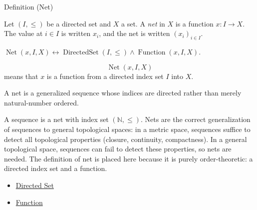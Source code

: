 \begin{definitionbox}{Definition (Net)}
\begin{definition}[Net]\label{def:net}
Let $(I, \leq)$ be a directed set and $X$ a set. A \emph{net} in $X$ is a
function $x : I \to X$. The value at $i \in I$ is written $x_i$, and the
net is written $(x_i)_{i \in I}$.
\end{definition}
\end{definitionbox}

\begin{remark*}
$\operatorname{Net}(x,I,X)\leftrightarrow
\operatorname{DirectedSet}(I,\leq)\wedge \operatorname{Function}(x,I,X)$.
\end{remark*}

\begin{remark*}
\[
  \operatorname{Net}(x,I,X)
\] means that $x$ is a function from a directed index
set $I$ into $X$.
\end{remark*}

\begin{remark*}[Interpretation]
A net is a generalized sequence whose indices are directed rather than merely
natural-number ordered.
\end{remark*}

\begin{remark*}[Exposition]
A sequence is a net with index set $(\mathbb{N}, \leq)$. Nets are the correct
generalization of sequences to general topological spaces: in a metric space,
sequences suffice to detect all topological properties (closure, continuity,
compactness). In a general topological space, sequences can fail to detect
these properties, so nets are needed. The definition of net is placed here
because it is purely order-theoretic: a directed index set and a function.
\end{remark*}

\begin{dependencies}
\begin{itemize}
  \item \hyperref[def:directed-set]{Directed Set}
  \item \hyperref[def:function]{Function}
\end{itemize}
\end{dependencies}
